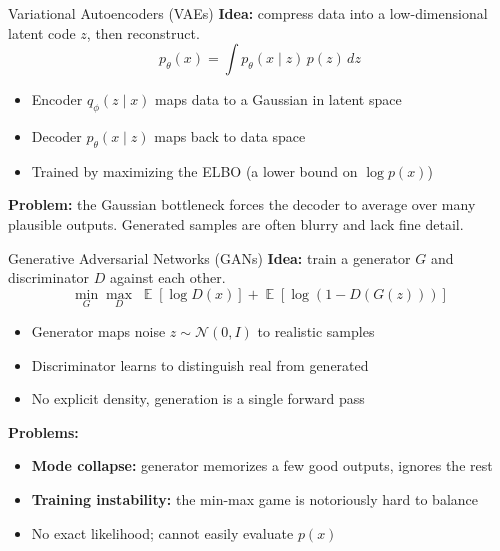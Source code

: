 \documentclass[10pt, aspectratio=169]{beamer}
\DeclareMathOperator*{\E}{\mathbb{E}}
\begin{document}
\begin{frame}{Variational Autoencoders (VAEs)}
  \textbf{Idea:} compress data into a low-dimensional latent code $z$, then reconstruct.
  \[
    p_\theta(x) = \int p_\theta(x \mid z)\,p(z)\,dz
  \]
  \begin{itemize}
    \item Encoder $q_\phi(z\mid x)$ maps data to a Gaussian in latent space
    \item Decoder $p_\theta(x\mid z)$ maps back to data space
    \item Trained by maximizing the ELBO (a lower bound on $\log p(x)$)
  \end{itemize}
  \textbf{Problem:} the Gaussian bottleneck forces the decoder to average over many plausible outputs.
  Generated samples are often blurry and lack fine detail.
\end{frame}

\begin{frame}{Generative Adversarial Networks (GANs)}
  \textbf{Idea:} train a generator $G$ and discriminator $D$ against each other.
  \[
    \min_G \max_D \;\E[\log D(x)] + \E[\log(1 - D(G(z)))]
  \]
  \begin{itemize}
    \item Generator maps noise $z \sim \mathcal{N}(0,I)$ to realistic samples
    \item Discriminator learns to distinguish real from generated
    \item No explicit density, generation is a single forward pass
  \end{itemize}
  \textbf{Problems:}
  \begin{itemize}
    \item \textbf{Mode collapse:} generator memorizes a few good outputs, ignores the rest
    \item \textbf{Training instability:} the min-max game is notoriously hard to balance
    \item No exact likelihood; cannot easily evaluate $p(x)$
  \end{itemize}
\end{frame}
\end{document}
